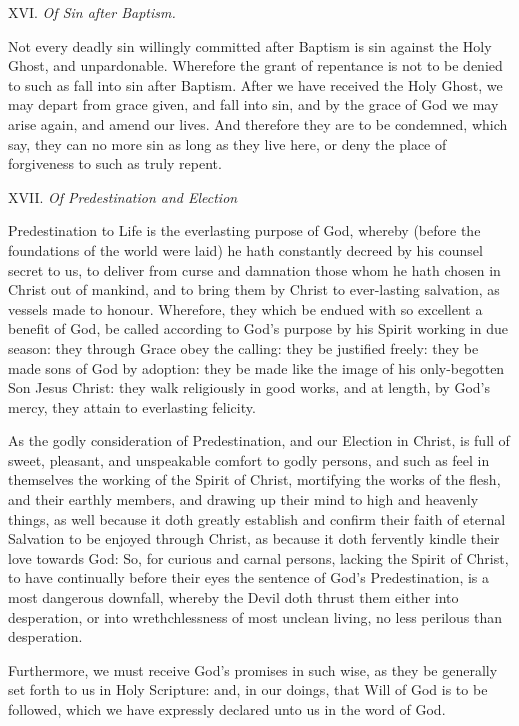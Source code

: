 XVI.
\emph{Of Sin after Baptism.}

Not
every deadly sin willingly committed after Baptism is sin against the
Holy Ghost, and unpardonable. Wherefore the grant of repentance is not
to be denied to such as fall into sin after Baptism. After we have received
the Holy Ghost, we may depart from grace given, and fall into sin, and
by the grace of God we may arise again, and amend our lives. And therefore
they are to be condemned, which say, they can no more sin as long as they
live here, or deny the place of forgiveness to such as truly repent.

XVII. \emph{Of Predestination
and Election}

Predestination
to Life is the everlasting purpose of God, whereby (before the foundations
of the world were laid) he hath constantly decreed by his counsel secret
to us, to deliver from curse and damnation those whom he hath chosen in
Christ out of mankind, and to bring them by Christ to ever-lasting salvation,
as vessels made to honour. Wherefore, they which be endued with so excellent
a benefit of God, be called according to God's purpose by his Spirit working
in due season: they through Grace obey the calling: they be justified
freely: they be made sons of God by adoption: they be made like the image
of his only-begotten Son Jesus Christ: they walk religiously in good works,
and at length, by God's mercy, they attain to everlasting felicity.

As the godly consideration of Predestination, and our Election in Christ,
is full of sweet, pleasant, and unspeakable comfort to godly persons,
and such as feel in themselves the working of the Spirit of Christ, mortifying
the works of the flesh, and their earthly members, and drawing up their
mind to high and heavenly things, as well because it doth greatly establish
and confirm their faith of eternal Salvation to be enjoyed through Christ,
as because it doth fervently kindle their love towards God: So, for curious
and carnal persons, lacking the Spirit of Christ, to have continually
before their eyes the sentence of God’s Predestination, is a most
dangerous downfall, whereby the Devil doth thrust them either into desperation,
or into wrethchlessness of most unclean living, no less perilous than
desperation.

Furthermore, we must receive God's promises in such
wise, as they be generally set forth to us in Holy Scripture: and, in
our doings, that Will of God is to be followed, which we have expressly
declared unto us in the word of God.


